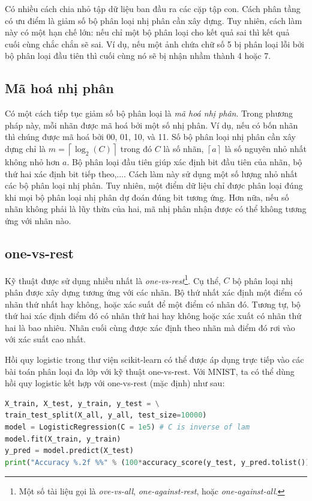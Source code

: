 Có nhiều cách chia nhỏ tập dữ liệu ban đầu ra các cặp tập con. Cách phân tầng có ưu điểm là giảm số bộ phân loại nhị phân cần xây dựng. Tuy nhiên, cách làm này có một hạn chế lớn: nếu chỉ một bộ phân loại cho kết quả sai thì kết quả cuối cùng chắc chắn sẽ sai. Ví dụ, nếu một ảnh chứa chữ
số {5} bị phân loại lỗi bởi bộ phân loại đầu tiên thì cuối cùng nó sẽ bị nhận nhầm thành 4 hoặc 7.


\subsection{Mã hoá nhị phân}
Có một cách tiếp tục giảm số bộ phân loại là \textit{mã hoá nhị phân}. Trong phương pháp này, mỗi nhãn được mã hoá bởi một số nhị phân. Ví dụ, nếu có bốn nhãn thì chúng được mã hoá bởi 00, 01, 10, và 11. Số bộ phân loại nhị phân cần xây dựng chỉ là $m =
\left\lceil\log_2(C)\right\rceil$ trong đó $C$ là số nhãn, $\left\lceil a
\right\rceil$ là {số nguyên nhỏ nhất không nhỏ hơn} $a$. Bộ phân loại đầu tiên giúp xác định bit đầu tiên của nhãn, bộ thứ hai xác định bit tiếp theo,....
Cách làm này sử dụng một số lượng nhỏ nhất các bộ phân loại nhị phân. Tuy
nhiên, một điểm dữ liệu chỉ được phân loại đúng khi mọi bộ phân loại nhị phân dự đoán đúng bit tương ứng. Hơn nữa, nếu số nhãn không phải là lũy thừa của hai,
mã nhị phân nhận được có thể không tương ứng với nhãn nào.


\subsection{one-vs-rest}
Kỹ thuật được sử dụng nhiều nhất là \textit{one-vs-rest}\footnote{Một số tài
liệu gọi là \textit{ove-vs-all}, \textit{one-against-rest}, hoặc
\textit{one-against-all}.}. Cụ thể, $C$ bộ phân loại nhị phân được xây dựng
tương ứng với các nhãn. Bộ thứ nhất xác định một điểm có nhãn thứ nhất hay
không, hoặc xác suất để một điểm có nhãn đó. Tương tự, bộ thứ hai xác định điểm
đó có nhãn thứ hai hay không hoặc xác xuất có nhãn thứ hai là bao nhiêu. Nhãn
cuối cùng được xác định theo nhãn mà điểm đó rơi vào với xác suất cao nhất.



Hồi quy logistic trong thư viện scikit-learn có thể được áp dụng trực tiếp
vào các bài toán phân loại đa lớp với kỹ thuật {one-vs-rest}. Với MNIST, ta có thể dùng hồi quy logistic kết hợp với one-vs-rest (mặc định) như sau:
\begin{lstlisting}[language=Python]
X_train, X_test, y_train, y_test = \
train_test_split(X_all, y_all, test_size=10000)
model = LogisticRegression(C = 1e5) # C is inverse of lam
model.fit(X_train, y_train)
y_pred = model.predict(X_test)
print("Accuracy %.2f %%" % (100*accuracy_score(y_test, y_pred.tolist())))
\end{lstlisting}

